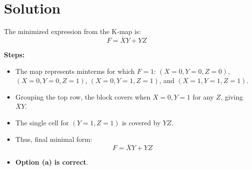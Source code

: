 \documentclass{article}
\begin{document}
\section*{Solution}
The minimized expression from the K-map is:
\[
F = \overline{X}Y + YZ
\]

\textbf{Steps:}
\begin{itemize}
    \item The map represents minterms for which \( F=1 \):  
    \( (X=0, Y=0, Z=0) \), \( (X=0, Y=0, Z=1) \), \( (X=0, Y=1, Z=1) \), and \( (X=1, Y=1, Z=1) \).
    \item Grouping the top row, the block covers when \( X=0, Y=1 \) for any \( Z \), giving \( \overline{X}Y \).
    \item The single cell for \( (Y=1, Z=1) \) is covered by \( YZ \).
    \item Thus, final minimal form:  
    \[
    F = \overline{X}Y + YZ
    \]
    \item \textbf{Option (a) is correct}.
\end{itemize}
\end{document}
